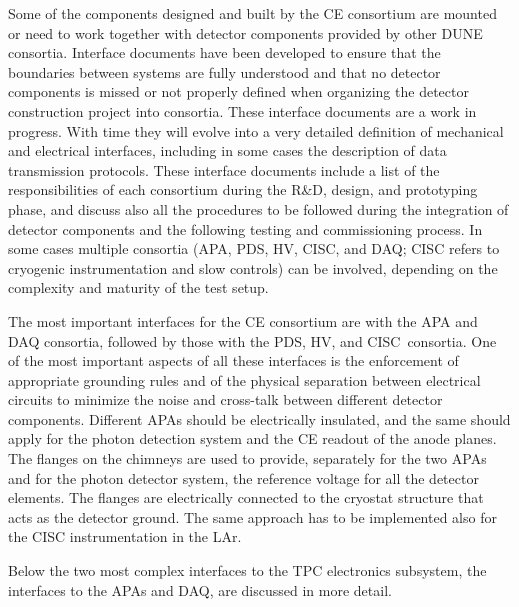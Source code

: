 Some of the components designed and built by the CE consortium are
mounted or need to work together with detector components provided by other DUNE
consortia. Interface documents have been developed to ensure that the boundaries
between systems are fully understood and that no detector components is missed or
not properly defined when organizing the detector construction project into
consortia. These interface documents are a work in progress. With time they will
evolve into a very detailed definition of mechanical and electrical interfaces,
including in some cases the description of data transmission protocols. These
interface documents include a list of the responsibilities of each consortium during the
R\&D, design, and prototyping phase, and discuss also all the procedures to be
followed during the integration of detector components and the following testing
and commissioning process. In some cases multiple consortia (APA, PDS, HV, CISC,
and DAQ; CISC refers to cryogenic instrumentation and slow controls) can be involved, depending on the complexity and maturity of the test
setup.

The most important interfaces for the CE consortium are with the APA and DAQ
consortia, followed by those with the PDS, HV, and CISC~consortia. One of the most
important aspects of all these interfaces is the enforcement of appropriate grounding rules
and of the physical separation between electrical circuits to minimize the noise and
cross-talk between different detector components. Different APAs should be electrically
insulated, and the same should apply for the photon detection system and the
CE readout of the anode planes. The flanges on the chimneys are used to provide,
separately for the two APAs and for the photon detector system, the reference
voltage for all the detector elements. The flanges are electrically connected
to the cryostat structure that acts as the detector ground. The same approach
has to be implemented also for the CISC instrumentation in the LAr.

Below the two most complex interfaces to the TPC electronics subsystem, the
interfaces to the APAs and DAQ, are discussed in more detail.

